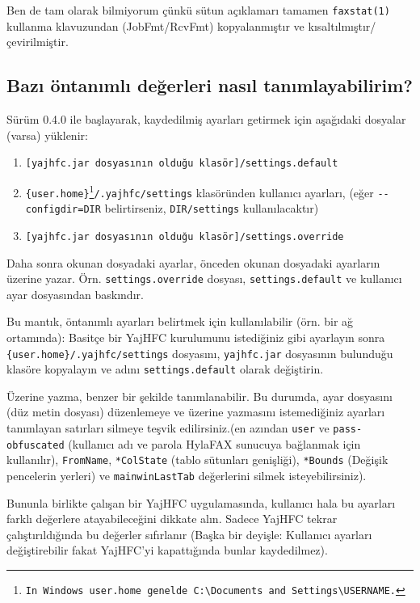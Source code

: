 \documentclass[a4paper,10pt]{scrartcl}
\begin{document}
Ben de tam olarak bilmiyorum çünkü sütun açıklamarı 
tamamen \verb.faxstat(1). kullanma klavuzundan (JobFmt/RcvFmt) kopyalanmıştır
ve kısaltılmıştır/çevirilmiştir. 

\subsection{Bazı öntanımlı değerleri nasıl tanımlayabilirim?}

Sürüm 0.4.0 ile başlayarak, kaydedilmiş ayarları getirmek için aşağıdaki dosyalar (varsa) yüklenir:
\begin{enumerate}
 \item \texttt{[yajhfc.jar dosyasının olduğu klasör]/settings.default}
 \item \texttt{\{user.home\}\footnote{In Windows \texttt{user.home} genelde \texttt{C:\textbackslash Documents and Settings\textbackslash USERNAME}.}/.yajhfc/settings} klasöründen kullanıcı ayarları, (eğer \texttt{-{-}configdir=DIR} belirtirseniz, \texttt{DIR/settings} kullanılacaktır)
 \item \texttt{[yajhfc.jar dosyasının olduğu klasör]/settings.override}
\end{enumerate}

Daha sonra okunan dosyadaki ayarlar, önceden okunan dosyadaki ayarların üzerine yazar. Örn. \texttt{settings.override} dosyası, \texttt{settings.default} ve kullanıcı ayar dosyasından baskındır.
\medskip

Bu mantık, öntanımlı ayarları belirtmek için kullanılabilir (örn. bir ağ ortamında):
Basitçe bir YajHFC kurulumunu istediğiniz gibi ayarlayın sonra \texttt{\{user.home\}/.yajhfc/settings} dosyasını, \texttt{yajhfc.jar} dosyasının bulunduğu klasöre kopyalayın ve adını \texttt{settings.default} olarak değiştirin.
\medskip

Üzerine yazma, benzer bir şekilde tanımlanabilir. Bu durumda, ayar dosyasını (düz metin dosyası) düzenlemeye ve üzerine yazmasını istemediğiniz ayarları tanımlayan satırları silmeye teşvik edilirsiniz.(en azından \texttt{user} ve \texttt{pass-obfuscated} (kullanıcı adı ve parola HylaFAX sunucuya bağlanmak için kullanılır), \texttt{FromName}, \texttt{*ColState} (tablo sütunları genişliği), \texttt{*Bounds} (Değişik pencelerin yerleri) ve \texttt{mainwinLastTab} değerlerini silmek isteyebilirsiniz).

Bununla birlikte çalışan bir YajHFC uygulamasında, kullanıcı hala bu ayarları farklı değerlere atayabileceğini dikkate alın.
Sadece YajHFC tekrar çalıştırıldığında bu değerler sıfırlanır (Başka bir deyişle: Kullanıcı ayarları değiştirebilir fakat YajHFC'yi kapattığında bunlar kaydedilmez).
\end{document}
